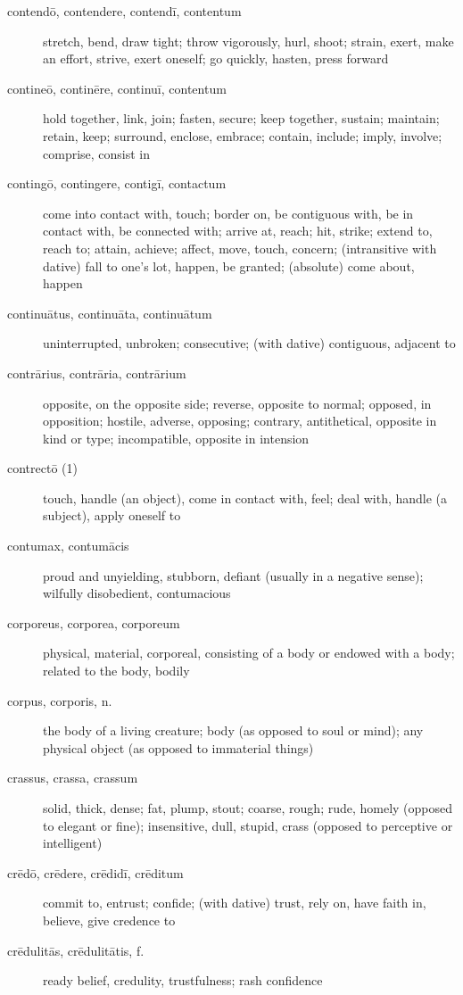 \begin{description}
    \item[contendō, contendere, contendī, contentum] stretch, bend, draw tight; throw vigorously, hurl, shoot; strain, exert, make an effort, strive, exert oneself; go quickly, hasten, press forward
    \item[contineō, continēre, continuī, contentum] hold together, link, join; fasten, secure; keep together, sustain; maintain; retain, keep; surround, enclose, embrace; contain, include; imply, involve; comprise, consist in
    \item[contingō, contingere, contigī, contactum] \marginnote{*}come into contact with, touch; border on, be contiguous with, be in contact with, be connected with; arrive at, reach; hit, strike; extend to, reach to; attain, achieve; affect, move, touch, concern; (intransitive with dative) fall to one's lot, happen, be granted; (absolute) come about, happen
    \item[continuātus, continuāta, continuātum] uninterrupted, unbroken; consecutive; (with dative) contiguous, adjacent to
    \item[contrārius, contrāria, contrārium] opposite, on the opposite side; reverse, opposite to normal; opposed, in opposition; hostile, adverse, opposing; contrary, antithetical, opposite in kind or type; incompatible, opposite in intension
    \item[contrectō (1)] touch, handle (an object), come in contact with, feel; deal with, handle (a subject), apply oneself to
    \item[contumax, contumācis] proud and unyielding, stubborn, defiant (usually in a negative sense); wilfully disobedient, contumacious
    \item[corporeus, corporea, corporeum] \marginnote{*}physical, material, corporeal, consisting of a body or endowed with a body; related to the body, bodily
    \item[corpus, corporis, n.] \marginnote{*}the body of a living creature; body (as opposed to soul or mind); any physical object (as opposed to immaterial things)
    \item[crassus, crassa, crassum] solid, thick, dense; fat, plump, stout; coarse, rough; rude, homely (opposed to elegant or fine); insensitive, dull, stupid, crass (opposed to perceptive or intelligent)
    \item[crēdō, crēdere, crēdidī, crēditum] \marginnote{*}commit to, entrust; confide; (with dative) trust, rely on, have faith in, believe, give credence to
    \item[crēdulitās, crēdulitātis, f.] ready belief, credulity, trustfulness; rash confidence

\end{description}
